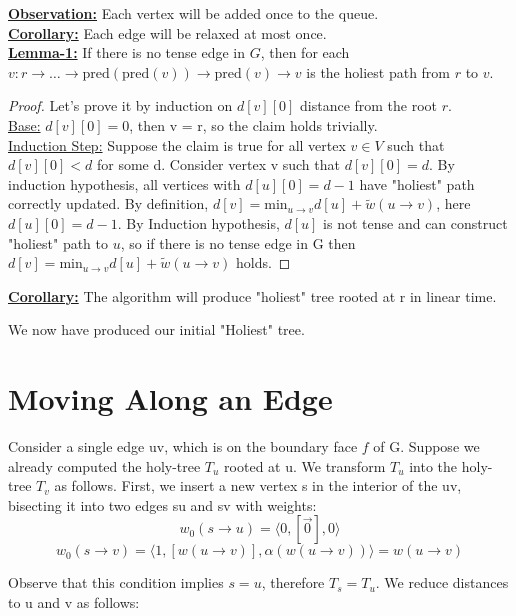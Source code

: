 \documentclass{article}
\begin{document}
\textbf{\underline{Observation:}} Each vertex will be added once to the queue. \\

\textbf{\underline{Corollary:}} Each edge will be relaxed at most once. \\

\textbf{\underline{Lemma-1:}} If there is no tense edge in $G$, then for each 
$v: r \rightarrow \ldots \rightarrow \text{pred}(\text{pred}(v)) \rightarrow 
\text{pred}(v) \rightarrow v$ is the holiest path from $r$ to $v$.

\begin{proof} Let's prove it by induction on $d[v][0]$ distance from the root $r$. \\
\underline{Base:} $d[v][0] = 0$, then v = r, so the claim holds trivially. \\
\underline{Induction Step:} Suppose the claim is true for all vertex $v \in V$ 
such that $d[v][0] < d$ for some d. Consider vertex v such that $d[v][0] = d$. 
By induction hypothesis, all vertices with $d[u][0] = d-1$ have "holiest" path 
correctly updated. By definition, $d[v] = \text{min}_{u \rightarrow v}{d[u] + 
\tilde w(u \rightarrow v)}$, here $d[u][0] = d-1$. By Induction hypothesis, $d[u]$ 
is not tense and can construct "holiest" path to $u$, so if there is no tense
edge in G then $d[v] = \text{min}_{u \rightarrow v}{d[u] + \tilde w(u \rightarrow v)}$ 
holds.
\end{proof}

\textbf{\underline{Corollary:}} The algorithm will produce "holiest" tree rooted at r in linear time.

We now have produced our initial "Holiest" tree.

\section{Moving Along an Edge}
Consider a single edge uv, which is on the boundary face $f$ of G. Suppose we
already computed the holy-tree $T_u$ rooted at u.  We transform $T_u$
into the holy-tree $T_v$ as follows. First, we insert a new vertex s in the
interior of the uv, bisecting it into two edges su and sv with weights:
\[ w_{0}(s \rightarrow u) = \langle 0, [\vec{0}], 0 \rangle \]
\[ w_{0}(s \rightarrow v) = \langle 1, [w(u \rightarrow v)], 
  \alpha(w(u \rightarrow v)) \rangle = w(u \rightarrow v)\]

Observe that this condition implies $s = u$, therefore $T_s = T_u$. We reduce 
distances to u and v as follows:
\end{document}
